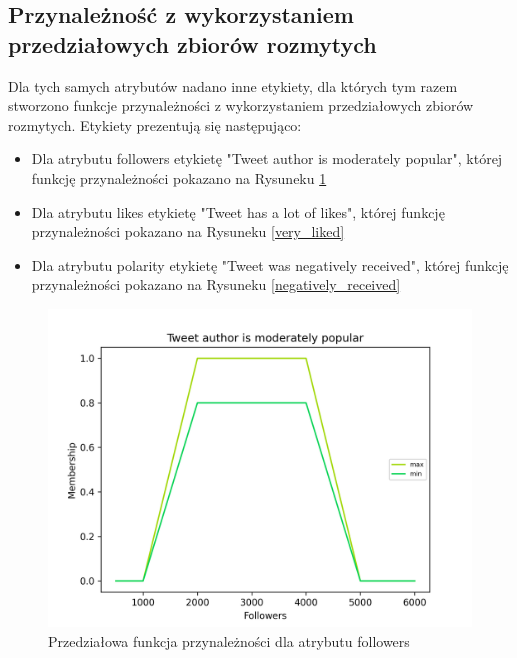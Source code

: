 \documentclass{classrep}
\begin{document}
\subsection{Przynależność z wykorzystaniem przedziałowych zbiorów rozmytych}

Dla tych samych atrybutów nadano inne etykiety, dla których tym razem stworzono funkcje przynależności z wykorzystaniem przedziałowych zbiorów rozmytych. Etykiety prezentują się następująco:

\begin{itemize}
    \item Dla atrybutu followers etykietę "Tweet author is moderately popular", której funkcję przynależności pokazano na Rysuneku \ref{moderately_popular}
    \item Dla atrybutu likes etykietę "Tweet has a lot of likes", której funkcję przynależności pokazano na Rysuneku \ref{very_liked}
    \item Dla atrybutu polarity etykietę "Tweet was negatively received", której funkcję przynależności pokazano na Rysuneku \ref{negatively_received}
\end{itemize}

\begin{figure}[H]
    \centering
    \includegraphics[width=1\textwidth]{resources/stage3/Tweet author is moderately popular.png}
    \caption{Przedziałowa funkcja przynależności dla atrybutu followers}
    \label{moderately_popular}
\end{figure}
\end{document}
